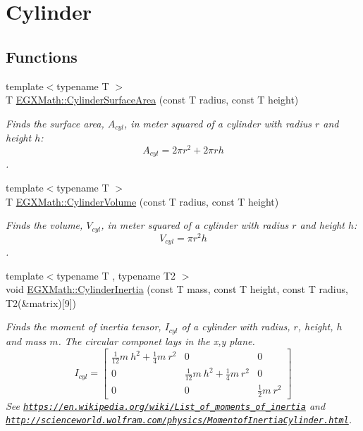 \hypertarget{group___e_g_x_math-_geometry-3_d-_cylinder}{}\section{Cylinder}
\label{group___e_g_x_math-_geometry-3_d-_cylinder}
\subsection*{Functions}
\begin{DoxyCompactItemize}
\item 
{\footnotesize template$<$typename T $>$ }\\T \mbox{\hyperlink{group___e_g_x_math-_geometry-3_d-_cylinder_gaf14619f5d525e14150a43b9898adb258}{E\+G\+X\+Math\+::\+Cylinder\+Surface\+Area}} (const T radius, const T height)
\begin{DoxyCompactList}\small\item\em Finds the surface area, $A_{cyl}$, in meter squared of a cylinder with radius $r$ and height $h$\+: \[ A_{cyl}=2\pi r^2 + 2\pi r h \]. \end{DoxyCompactList}\item 
{\footnotesize template$<$typename T $>$ }\\T \mbox{\hyperlink{group___e_g_x_math-_geometry-3_d-_cylinder_ga9d1aa08f778f9ccbd79953063f11bc9b}{E\+G\+X\+Math\+::\+Cylinder\+Volume}} (const T radius, const T height)
\begin{DoxyCompactList}\small\item\em Finds the volume, $V_{cyl}$, in meter squared of a cylinder with radius $r$ and height $h$\+: \[ V_{cyl}=\pi r^2 h\]. \end{DoxyCompactList}\item 
{\footnotesize template$<$typename T , typename T2 $>$ }\\void \mbox{\hyperlink{group___e_g_x_math-_geometry-3_d-_cylinder_gae7dca080058b400feb0d69f78af7a850}{E\+G\+X\+Math\+::\+Cylinder\+Inertia}} (const T mass, const T height, const T radius, T2(\&matrix)\mbox{[}9\mbox{]})
\begin{DoxyCompactList}\small\item\em Finds the moment of inertia tensor, $I_{cyl}$ of a cylinder with radius, $r$, height, $h$ and mass $m$. The circular componet lays in the x,y plane. \[ I_{cyl}=\begin{bmatrix} \frac{1}{12}m\ h^2 + \frac{1}{4}m\ r^2 & 0 & 0\\ 0 & \frac{1}{12}m\ h^2 + \frac{1}{4}m\ r^2 & 0\\ 0 & 0 & \frac{1}{2}m\ r^2 \end{bmatrix} \] See \href{https://en.wikipedia.org/wiki/List_of_moments_of_inertia}{\tt https\+://en.\+wikipedia.\+org/wiki/\+List\+\_\+of\+\_\+moments\+\_\+of\+\_\+inertia} and \href{http://scienceworld.wolfram.com/physics/MomentofInertiaCylinder.html}{\tt http\+://scienceworld.\+wolfram.\+com/physics/\+Momentof\+Inertia\+Cylinder.\+html}. \end{DoxyCompactList}\item 

\end{DoxyCompactItemize}
